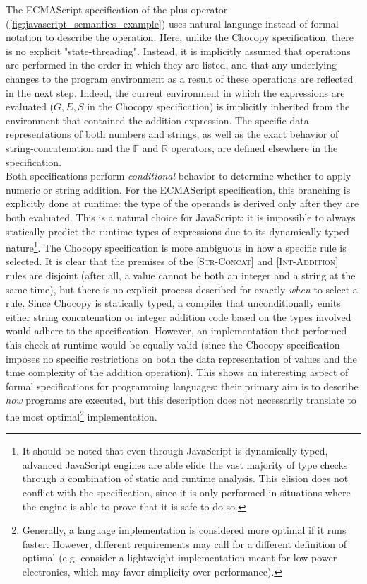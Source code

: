 The ECMAScript specification of the plus operator (\cref{fig:javascript_semantics_example}) uses natural language instead of formal notation to describe the operation. Here, unlike the Chocopy specification, there is no explicit "state-threading". Instead, it is implicitly assumed that operations are performed in the order in which they are listed, and that any underlying changes to the program environment as a result of these operations are reflected in the next step. Indeed, the current environment in which the expressions are evaluated ($ G, E, S $ in the Chocopy specification) is implicitly inherited from the environment that contained the addition expression. The specific data representations of both numbers and strings, as well as the exact behavior of string-concatenation and the $\mathbb{F}$ and $\mathbb{R}$ operators, are defined elsewhere in the specification.\\

Both specifications perform \textit{conditional} behavior to determine whether to apply numeric or string addition. For the ECMAScript specification, this branching is explicitly done at runtime: the type of the operands is derived only after they are both evaluated. This is a natural choice for JavaScript: it is impossible to always statically predict the runtime types of expressions due to its dynamically-typed nature\footnote{It should be noted that even through JavaScript is dynamically-typed, advanced JavaScript engines are able elide the vast majority of type checks through a combination of static and runtime analysis. This elision does not conflict with the specification, since it is only performed in situations where the engine is able to prove that it is safe to do so.}. The Chocopy specification is more ambiguous in how a specific rule is selected. It is clear that the premises of the \textsc{[Str-Concat]} and \textsc{[Int-Addition]} rules are disjoint (after all, a value cannot be both an integer and a string at the same time), but there is no explicit process described for exactly \textit{when} to select a rule. Since Chocopy is statically typed, a compiler that unconditionally emits either string concatenation or integer addition code based on the types involved would adhere to the specification. However, an implementation that performed this check at runtime would be equally valid (since the Chocopy specification imposes no specific restrictions on both the data representation of values and the time complexity of the addition operation). This shows an interesting aspect of formal specifications for programming languages: their primary aim is to describe \textit{how} programs are executed, but this description does not necessarily translate to the most optimal\footnote{Generally, a language implementation is considered more optimal if it runs faster. However, different requirements may call for a different definition of optimal (e.g. consider a lightweight implementation meant for low-power electronics, which may favor simplicity over performance).} implementation.\\

